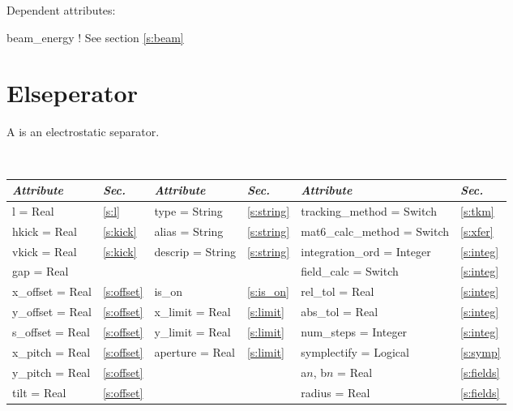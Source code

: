 \vskip0.05in \noindent
Dependent attributes:
\begin{example}
  beam\_energy  ! See section \ref{s:beam}
\end{example}

\section{Elseperator}
\label{s:elsep}

A  is an electrostatic separator.

\toffset
\begin{center}
\tt
\begin{tabular}{|l|l||l|l||l|l|} \hline
  {\sl Attribute} & {\sl Sec.}  & {\sl Attribute} & {\sl Sec.} & {\sl Attribute} & {\sl Sec.} \\ \hline
  l        = Real       & \ref{s:l}      & type = String      & \ref{s:string} & tracking\_method = Switch   & \ref{s:tkm}   \\ \hline
  hkick    = Real       & \ref{s:kick}   & alias = String     & \ref{s:string} & mat6\_calc\_method = Switch & \ref{s:xfer}  \\ \hline
  vkick    = Real       & \ref{s:kick}   & descrip = String   & \ref{s:string} & integration\_ord = Integer  & \ref{s:integ} \\ \hline
  gap      = Real       &                &                    &                & field\_calc = Switch        & \ref{s:integ} \\ \hline
  x\_offset  = Real     & \ref{s:offset} & is\_on             & \ref{s:is_on}  & rel\_tol = Real             & \ref{s:integ} \\ \hline
  y\_offset  = Real     & \ref{s:offset} & x\_limit = Real    & \ref{s:limit}  & abs\_tol = Real             & \ref{s:integ} \\ \hline
  s\_offset  = Real     & \ref{s:offset} & y\_limit = Real    & \ref{s:limit}  & num\_steps = Integer        & \ref{s:integ} \\ \hline
  x\_pitch = Real       & \ref{s:offset} & aperture = Real    & \ref{s:limit}  & symplectify = Logical       & \ref{s:symp}  \\ \hline
  y\_pitch = Real       & \ref{s:offset} &                    &                & a$n$, b$n$ = Real           & \ref{s:fields}\\ \hline
  tilt     = Real       & \ref{s:offset} &                    &                & radius = Real               & \ref{s:fields}\\ \hline
\end{tabular}
\end{center}
\toffset

